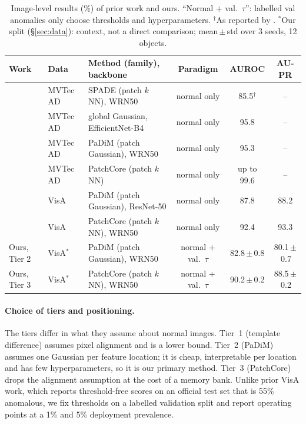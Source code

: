 \begin{table}[t]
  \centering
  \small
  \setlength{\tabcolsep}{5pt}
  \begin{tabular}{@{}lllccc@{}}
    \toprule
    Work & Data & Method (family), backbone & Paradigm & AUROC & AU-PR \\
    \midrule
    \citet{cohen2020spade}     & MVTec AD & SPADE (patch $k$NN), WRN50 & normal only & 85.5$^\dagger$ & -- \\
    \citet{rippel2021modeling} & MVTec AD & global Gaussian, EfficientNet-B4 & normal only & 95.8 & -- \\
    \citet{defard2021padim}    & MVTec AD & PaDiM (patch Gaussian), WRN50 & normal only & 95.3 & -- \\
    \citet{roth2022towards}    & MVTec AD & PatchCore (patch $k$NN) & normal only & up to 99.6 & -- \\
    \citet{zou2022spot}        & VisA & PaDiM (patch Gaussian), ResNet-50 & normal only & 87.8 & 88.2 \\
    \citet{zou2022spot}        & VisA & PatchCore (patch $k$NN), WRN50 & normal only & 92.4 & 93.3 \\
    \midrule
    Ours, Tier 2 & VisA$^\ast$ & PaDiM (patch Gaussian), WRN50 & normal + val.\ $\tau$ & 82.8\,$\pm$\,0.8 & 80.1\,$\pm$\,0.7 \\
    Ours, Tier 3 & VisA$^\ast$ & PatchCore (patch $k$NN), WRN50 & normal + val.\ $\tau$ & 90.2\,$\pm$\,0.2 & 88.5\,$\pm$\,0.2 \\
    \bottomrule
  \end{tabular}
  \caption{Image-level results (\%) of prior work and ours. ``Normal + val.\ $\tau$'': labelled val
    anomalies only choose thresholds and hyperparameters. $^\dagger$As reported by
    \citet{defard2021padim}. $^\ast$Our split (\S\ref{sec:data}): context, not a direct comparison;
    mean\,$\pm$\,std over 3 seeds, 12 objects.}
  \label{tab:related}
\end{table}

\paragraph{Choice of tiers and positioning.}
The tiers differ in what they assume about normal images.
Tier~1 (template difference) assumes pixel alignment and is a lower bound.
Tier~2 (PaDiM) assumes one Gaussian per feature location; it is cheap, interpretable per location and
has few hyperparameters, so it is our primary method.
Tier~3 (PatchCore) drops the alignment assumption at the cost of a memory bank.
Unlike prior VisA work, which reports threshold-free scores on an official test set that is 55\%
anomalous, we fix thresholds on a labelled validation split and report operating points at a 1\% and
5\% deployment prevalence.
